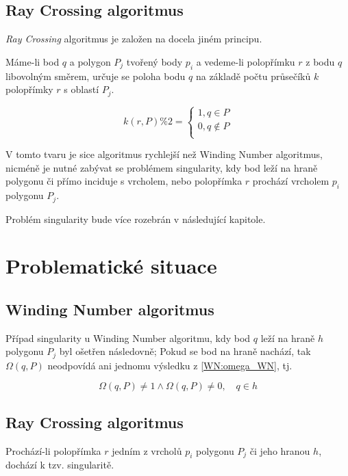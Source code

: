 \documentclass[11pt]{article}
\begin{document}
\subsection{Ray Crossing algoritmus}
\textit {Ray Crossing} algoritmus je založen na docela jiném principu. 

Máme-li bod $q$ a polygon ${P_{j}}$ tvořený body ${p_{i}}$ a  vedeme-li polopřímku $r$ z bodu $q$ libovolným směrem, určuje se poloha bodu $q$ na základě počtu průsečíků $k$ polopřímky $r$ s oblastí ${P_{j}}$.

\begin{equation}
k(r, P) \% 2= \left\{\begin{array}{l}
1, q \in P \\ 
0, q \notin P \\
\end{array} \right.
\label{RC:k}
\end{equation}

V tomto tvaru je sice algoritmus rychlejší než Winding Number algoritmus, nicméně je nutné zabývat se problémem singularity, kdy bod leží na hraně polygonu či přímo inciduje s vrcholem, nebo polopřímka $r$ prochází vrcholem ${p_{i}}$ polygonu ${P_{j}}$.

Problém singularity bude více rozebrán v následující kapitole.


\section{Problematické situace}

\subsection{Winding Number algoritmus}
Případ singularity u Winding Number algoritmu, kdy bod $q$ leží na hraně $h$ polygonu ${P_{j}}$ byl ošetřen následovně; Pokud se bod na hraně nachází, tak $\Omega(q, P)$ neodpovídá ani jednomu výsledku z \ref{WN:omega_WN}, tj. 

\begin{equation}
\Omega(q, P) \neq 1 \wedge \Omega(q, P) \neq 0, \quad q \in h
\end{equation}


\subsection{Ray Crossing algoritmus}
Prochází-li polopřímka $r$ jedním z vrcholů ${p_{i}}$ polygonu ${P_{j}}$ či jeho hranou $h$, dochází k tzv. singularitě.
\end{document}
